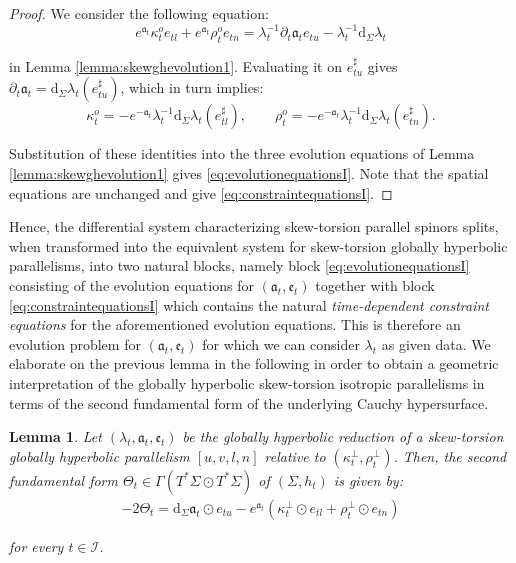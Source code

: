 \documentclass[10pt,reqno,a4paper]{amsart}
\theoremstyle{plain}
\newtheorem{lemma}[thm]{Lemma}
\theoremstyle{definition}
\theoremstyle{remark}
\theoremstyle{remark}
\def\dd{\mathrm{d}}
\def\cI{\mathcal{I}}
\def\fra{\mathfrak{a}}
\def\fre{\mathfrak{e}}
\renewcommand{\(}{ (}
\renewcommand{\)}{ )}
\begin{document}
\begin{proof}
We consider the following equation:
\begin{equation*}
 e^{\fra_t}\kappa^o_t e_{tl} + e^{\fra_t} \rho^o_t e_{tn} = \lambda_t^{-1}\partial_t \fra_t e_{tu}  - \lambda_t^{-1} \dd_{\Sigma} \lambda_t   
\end{equation*}

\noindent
in Lemma \ref{lemma:skewghevolution1}.  Evaluating it on $e^{\sharp}_{tu}$ gives $\partial_t\fra_t=\dd_\Sigma\lambda_t(e^{\sharp}_{tu})$, which in turn implies:
\begin{equation}
\label{eq:kapparhonormalcomponents}
\kappa_t^o=-e^{-\fra_t}\lambda_t^{-1} \dd_\Sigma\lambda_t(e^{\sharp}_{tl}), \qquad \rho_t^o=-e^{-\fra_t}\lambda_t^{-1} \dd_\Sigma\lambda_t(e^{\sharp}_{tn}).
\end{equation}

\noindent
Substitution of these identities into the three evolution equations of Lemma \ref{lemma:skewghevolution1} gives \eqref{eq:evolutionequationsI}. Note that the spatial equations are unchanged and give \eqref{eq:constraintequationsI}.
\end{proof}

\noindent
Hence, the differential system characterizing skew-torsion parallel spinors splits, when transformed into the equivalent system for skew-torsion globally hyperbolic parallelisms, into two natural blocks, namely block \eqref{eq:evolutionequationsI} consisting of the evolution equations for $(\fra_t,\fre_t)$ together with block \eqref{eq:constraintequationsI} which contains the natural \emph{time-dependent constraint equations} for the aforementioned evolution equations. This is therefore an evolution problem for $(\fra_t,\fre_t)$ for which we can consider $\lambda_t$ as given data. We elaborate on the previous lemma in the following in order to obtain a geometric interpretation of the globally hyperbolic skew-torsion isotropic parallelisms in terms of the second fundamental form of the underlying Cauchy hypersurface. 
 

\begin{lemma}
\label{lemma:ThetatI}
Let $(\lambda_t,\fra_t,\fre_t)$ be the globally hyperbolic reduction of a skew-torsion globally hyperbolic parallelism $[u,v,l,n]$ relative to $(\kappa^{\perp}_t , \rho^{\perp}_t)$. Then, the second fundamental form $\Theta_t \in \Gamma(T^{\ast}\Sigma \odot T^{\ast}\Sigma)$ of $(\Sigma,h_t)$ is given by:
\begin{eqnarray}
\label{eq:ThetatI}
-2 \Theta_t = \dd_{\Sigma} \fra_t \odot e_{tu} - e^{\fra_t} (\kappa^{\perp}_t \odot e_{tl} + \rho^{\perp}_t \odot e_{tn})
\end{eqnarray}

\noindent
for every $t\in \cI$.
\end{lemma}
\end{document}

